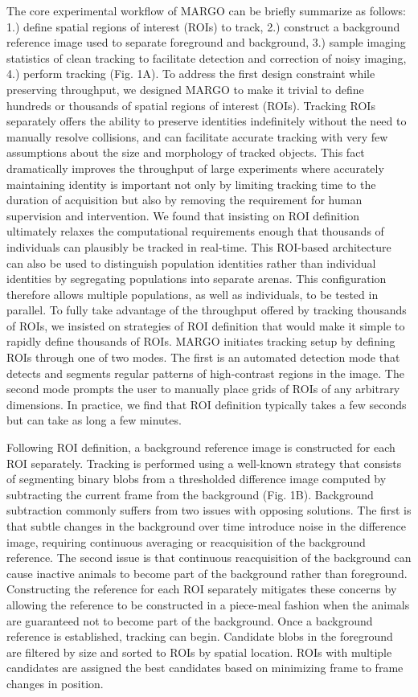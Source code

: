 \documentclass[10pt]{article}
\begin{document}
\begin{multicols}{2}
The core experimental workflow of MARGO can be briefly summarize as follows: 1.) define spatial regions of interest (ROIs) to track, 2.) construct a background reference image used to separate foreground and background, 3.) sample imaging statistics of clean tracking to facilitate detection and correction of noisy imaging, 4.) perform tracking (Fig. 1A). To address the first design constraint while preserving throughput, we designed MARGO to make it trivial to define hundreds or thousands of spatial regions of interest (ROIs). Tracking ROIs separately offers the ability to preserve identities indefinitely without the need to manually resolve collisions, and can facilitate accurate tracking with very few assumptions about the size and morphology of tracked objects. This fact dramatically improves the throughput of large experiments where accurately maintaining identity is important not only by limiting tracking time to the duration of acquisition but also by removing the requirement for human supervision and intervention. We found that insisting on ROI definition ultimately relaxes the computational requirements enough that thousands of individuals can plausibly be tracked in real-time. This ROI-based architecture can also be used to distinguish population identities rather than individual identities by segregating populations into separate arenas. This configuration therefore allows multiple populations, as well as individuals, to be tested in parallel. To fully take advantage of the throughput offered by tracking thousands of ROIs, we insisted on strategies of ROI definition that would make it simple to rapidly define thousands of ROIs. MARGO initiates tracking setup by defining ROIs through one of two modes. The first is an automated detection mode that detects and segments regular patterns of high-contrast regions in the image. The second mode prompts the user to manually place grids of ROIs of any arbitrary dimensions. In practice, we find that ROI definition typically takes a few seconds but can take as long a few minutes.

Following ROI definition, a background reference image is constructed for each ROI separately. Tracking is performed using a well-known strategy that consists of segmenting binary blobs from a thresholded difference image computed by subtracting the current frame from the background (Fig. 1B). Background subtraction commonly suffers from two issues with opposing solutions. The first is that subtle changes in the background over time introduce noise in the difference image, requiring continuous averaging or reacquisition of the background reference. The second issue is that continuous reacquisition of the background can cause inactive animals to become part of the background rather than foreground. Constructing the reference for each ROI separately mitigates these concerns by allowing the reference to be constructed in a piece-meal fashion when the animals are guaranteed not to become part of the background. Once a background reference is established, tracking can begin. Candidate blobs in the foreground are filtered by size and sorted to ROIs by spatial location. ROIs with multiple candidates are assigned the best candidates based on minimizing frame to frame changes in position.


\end{multicols}
\end{document}
